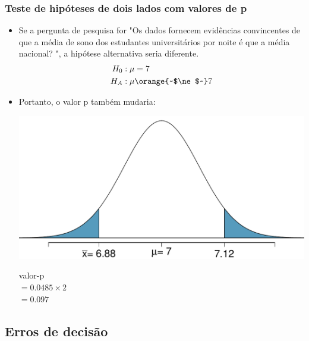 \documentclass[11pt]{beamer}
\begin{document}
\begin{frame}
\frametitle{Teste de hipóteses de dois lados com valores de p}

\begin{itemize}

\item Se a pergunta de pesquisa for "Os dados fornecem evidências convincentes de que a média de sono dos estudantes universitários por noite é  que a média nacional? ", a hipótese alternativa seria diferente.
\begin{align*}
H_0&: \mu = 7 \\
H_A&: \mu \orange{~$\ne$~} 7
\end{align*}

\pause

\item Portanto, o valor p também mudaria:
{
\begin{center}
\includegraphics[width=\textwidth]{sleep_pval_ts.pdf}
\end{center}
}
{
valor-p \\
$= 0.0485 \times 2$ \\
$= 0.097$
}

\end{itemize}

\end{frame}


\subsection{Erros de decisão}

\end{document}
